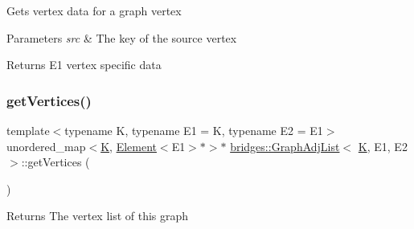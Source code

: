 \begin{DoxyVerb}Gets vertex data for a graph vertex
\end{DoxyVerb}



\begin{DoxyParams}{Parameters}
{\em src} & The key of the source vertex\\
\hline
\end{DoxyParams}
\begin{DoxyReturn}{Returns}
E1 vertex specific data 
\end{DoxyReturn}
\mbox{\label{classbridges_1_1_graph_adj_list_a157c80e2bd439572f4f80e8850700297}} 
\subsubsection{\texorpdfstring{getVertices()}{getVertices()}\hspace{0.1cm}{\footnotesize\ttfamily [1/2]}}
{\footnotesize\ttfamily template$<$typename K, typename E1 = K, typename E2 = E1$>$ \\
unordered\+\_\+map$<$\mbox{\hyperlink{namespacebridges_acfb0a4f7877d8f63de3e6862004c50edaa5f3c6a11b03839d46af9fb43c97c188}{K}}, \mbox{\hyperlink{classbridges_1_1_element}{Element}}$<$E1$>$$\ast$$>$$\ast$ \mbox{\hyperlink{classbridges_1_1_graph_adj_list}{bridges\+::\+Graph\+Adj\+List}}$<$ \mbox{\hyperlink{namespacebridges_acfb0a4f7877d8f63de3e6862004c50edaa5f3c6a11b03839d46af9fb43c97c188}{K}}, E1, E2 $>$\+::get\+Vertices (\begin{DoxyParamCaption}{ }\end{DoxyParamCaption})\hspace{0.3cm}{\ttfamily [inline]}}

\begin{DoxyReturn}{Returns}
The vertex list of this graph 
\end{DoxyReturn}
\mbox{\label{classbridges_1_1_graph_adj_list_ac33be2c332e16c0060969808eda1609b}} 
